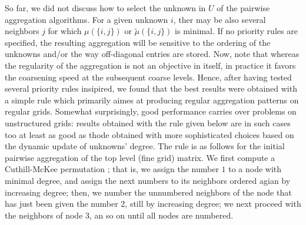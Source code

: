 So far, we did not discuss how to select the unknown in $U$ of the pairwise
aggregation algorithms. For a given unknown $i$, ther may be also several
neighbors $j$ for which $ \mu(\{i,j\})$ or $\tilde{\mu}(\{i,j\})$ is minimal.
If no priority rules are specified, the resulting aggregation will be
sensitive to the ordering of the unknowns and/or the way off-diagonal entries
are stored. Now, note that whereas the regularity of the aggregation is not an
objective in itself, in practice it favors the coarsening speed at the
subsequent coarse levels. Hence, after having tested several priority rules
insipired, we found that the best results were obtained with a simple rule
which primarily aimes at producing regular aggregation patterns on regular
grids. Somewhat surprisingly, good performance carries over problems on
unstructured grids: results obtained with the rule given below are in such
cases too at least as good as thode obtained with more sophisticated choices
based on the dynamic update of unknowns' degree. The rule is as follows for
the initial pairwise aggregation of the top level (fine grid) matrix. We first
compute a Cuthill-McKee permutation \cite{cmk}; that is, we assign the number
$1$ to a node with minimal degree, and assign the next numbers to its
neighbors ordered agian by increasing degree; then, we number the unnumbered
neighbors of the node that has just been given the number 2, still by
increasing degree; we next proceed with the neighbors of node 3, an so on
until all nodes are numbered.

